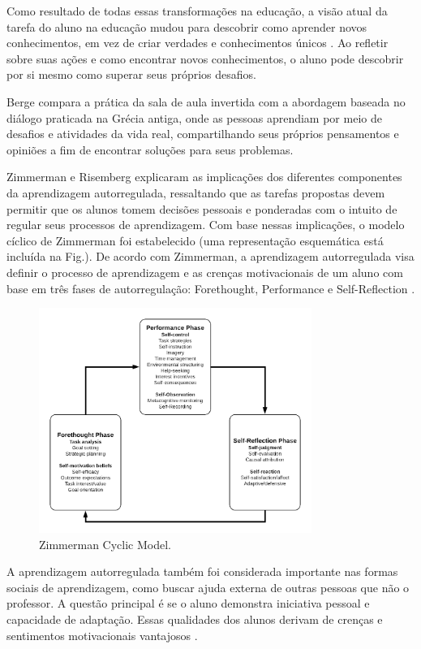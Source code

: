 Como resultado de todas essas transformações na educação, a visão atual da tarefa do aluno na educação mudou para descobrir como aprender novos conhecimentos, em vez de criar verdades e conhecimentos únicos \cite{ebert_school_2013}. Ao refletir sobre suas ações e como encontrar novos conhecimentos, o aluno pode descobrir por si mesmo como superar seus próprios desafios.

Berge\cite{berge_computer_1995} compara a prática da sala de aula invertida com a abordagem baseada no diálogo praticada na Grécia antiga, onde as pessoas aprendiam por meio de desafios e atividades da vida real, compartilhando seus próprios pensamentos e opiniões a fim de encontrar soluções para seus problemas.

Zimmerman e Risemberg \cite{zimmerman_chapter_1997} explicaram as implicações dos diferentes componentes da aprendizagem autorregulada, ressaltando que as tarefas propostas devem permitir que os alunos tomem decisões pessoais e ponderadas com o intuito de regular seus processos de aprendizagem. Com base nessas implicações, o modelo cíclico de Zimmerman \cite{zimmerman_chapter_2000} foi estabelecido (uma representação esquemática está incluída na Fig.). De acordo com Zimmerman, a aprendizagem autorregulada visa definir o processo de aprendizagem e as crenças motivacionais de um aluno com base em três fases de autorregulação: Forethought, Performance e Self-Reflection \cite {zimmerman_investigating_2008}.

\begin{figure}[!t]
\centering
\includegraphics[width=3.5in]{chaps/Images/Zimmerman.png}
\caption{Zimmerman Cyclic Model.}
\label{fig:Zimmerman Model}
\end{figure}

A aprendizagem autorregulada também foi considerada importante nas formas sociais de aprendizagem, como buscar ajuda externa de outras pessoas que não o professor. A questão principal é se o aluno demonstra iniciativa pessoal e capacidade de adaptação. Essas qualidades dos alunos derivam de crenças e sentimentos motivacionais vantajosos \cite{zimmerman_chapter_2000}.

